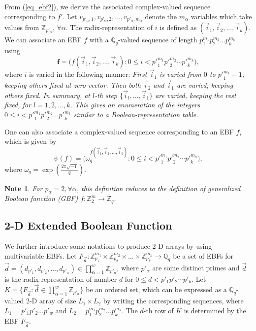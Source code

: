 \documentclass[pdflatex,sn-mathphys-num]{sn-jnl}%
\theoremstyle{thmstyleone}
\newtheorem{note}{Note}
\begin{document}
	From (\ref{eq_ebf2}), we derive the associated complex-valued sequence corresponding to $f'$.
	Let $v_{p'_\alpha,1}, v_{p'_\alpha,2}, \dots, v_{p'_\alpha,m_\alpha}$ denote the $m_\alpha$ variables which take values from $\mathbb{Z}_{p'_\alpha}$, $\forall \alpha$. The radix-representation of $i$ is defined as $\left( \vec{i}_1, \vec{i}_2, \dots, \vec{i}_k \right)$.
	We can associate an EBF $f$ with a $\mathbb{Q}_q$-valued sequence of length $p_1^{m_1} p_2^{m_2} \dots p_k^{m_k}$ using
	\begin{equation}
		\textbf{f}= \bigg( f \left( \vec{i}_1, \vec{i}_2, \dots, \vec{i}_k \right) :  0 \leq i < {p'}_1^{m_1} {p'}_2^{m_2} \cdots {p'}_k^{m_k} \bigg),
	\end{equation}
	where $i$ is varied in the following manner: 
	\textit{First $\vec{i}_1$ is varied from $0$ to ${p'}_1^{m_1}-1$, keeping others fixed at zero-vector. Then both $\vec{i}_2$ and $\vec{i}_1$ are varied, keeping others fixed. In summary, at $l$-th step $\{\vec{i}_{l}, \dots, \vec{i}_1\}$ are varied, keeping the rest fixed, for $l=1,2, \dots, k$. This gives an enumeration of the integers $0 \leq i < {p'}_1^{m_1} {p'}_2^{m_2} \dots {p'}_k^{m_k}$ similar to a Boolean-representation table.}
	
	One can also associate a complex-valued sequence corresponding to an EBF $f$, which is given by
	\begin{equation}
		\psi(f)= \bigg(\omega_q^{ f\left( \vec{i}_1, \vec{i}_2, \dots, \vec{i}_k \right) } :  0 \leq i < {p'}_1^{m_1} {p'}_2^{m_2} \cdots {p'}_k^{m_k} \bigg),
	\end{equation}
	where $\omega_q= \exp\left(\frac{2\pi \sqrt{-1}}{q}\right)$.
	
	\begin{note}
		For $p_\alpha=2, \forall \alpha$, this definition reduces to the definition of generalized Boolean function (GBF) $f: \mathbb{Z}_2^m \rightarrow \mathbb{Z}_q$.
	\end{note}
	
	\subsection{2-D Extended Boolean Function}
	We further introduce some notations to produce 2-D arrays by using multivariable EBFs. Let $F_{\vec{d}}: \mathbb{Z}_{p_1}^{m_1} \times \mathbb{Z}_{p_2}^{m_2} \times \dots \times \mathbb{Z}_{p_k}^{m_k} \rightarrow \mathbb{Q}_q$ be a set of EBFs for $\vec{d}= (d_{p'_1}, d_{p'_2}, \dots, d_{p'_w}) \in \prod_{\alpha=1}^{w} \mathbb{Z}_{p'_\alpha}$, where $p'_\alpha$ are some distinct primes and $\vec{d}$ is the radix-representation of number $d$ for $0 \leq d < p'_1 p'_2 \cdots p'_k$. Let $K = \{F_{ \vec{d}}: \vec{d} \in \prod_{\alpha=1}^{w} \mathbb{Z}_{p'_\alpha} \}$ be an ordered set, which can be expressed as a $\mathbb{Q}_q$-valued 2-D array of size $L_1 \times L_2$ by writing the corresponding sequences, where $L_1= p'_1p'_2 \dots p'_w$ and $L_2= p_1^{m_1} p_2^{m_2} \dots p_k^{m_k}$. The $d$-th row of $K$ is determined by the EBF $F_{ \vec{d}}$. 
	
\end{document}
